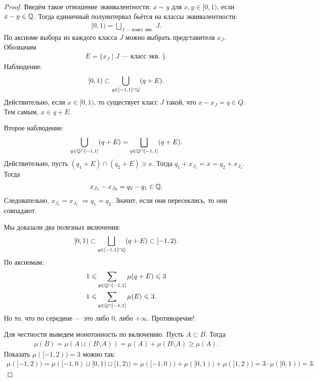 \begin{proof}
 Введём такое отношение эквивалентности: $ x \sim y $ для $ x,y \in [0, 1) $, если $ x-y \in \mathbb{Q} $. Тогда единичный полуинтервал бьётся на классы эквивалентности:
 \begin{align*}
  [0, 1) = \bigsqcup_{J \text{ --- класс экв. }} J
 .\end{align*} По аксиоме выбора из каждого класса $ J $ можно выбрать представителя $ x_J $. Обозначим
 \begin{align*}
  E = \{ x_J \mid J \text { --- класс экв. } \}
 .\end{align*} Наблюдение:
 \begin{align*}
  [0, 1) \subset \bigcup_{q \in [-1, 1] \cap \mathbb{Q}} (q + E)
 .\end{align*} Действительно, если $ x \in [0, 1) $, то существует класс $ J $ такой, что $ x - x_J = q \in Q $. Тем самым, $ x \in q + E $.

 Второе наблюдение:
 \begin{align*}
  \bigcup_{q \in \mathbb{Q} \cap [-1, 1]} (q + E) = \bigsqcup_{q \in \mathbb{Q} \cap [-1, 1]} (q + E)
 .\end{align*} Действительно, пусть $ (q_1 + E) \cap (q_2 + E) \ni x $. Тогда $ q_1 + x_{J_1} = x = q_2 + x_{J_2} $. Тогда
 \begin{align*}
  x_{J_1} - x_{J_2} = q_2 - q_1 \in \mathbb{Q}
 .\end{align*} Следовательно, $ x_{J_1} = x_{J_2} \;\Longrightarrow q_1 = q_2$. Значит, если они пересеклись, то они совпадают.
 
 Мы доказали два полезных включения:
 \begin{align*}
  [0, 1) \subset \bigsqcup_{q \in [-1, 1] \cap \mathbb{Q}} (q + E) \subset [-1, 2)
 .\end{align*} По аксиомам:
 \begin{align*}
  1 \leqslant &\sum_{q \in \mathbb{Q} \cap [-1, 1]} \mu(q + E) \leqslant 3 \\
  1 \leqslant &\sum_{q \in \mathbb{Q} \cap [-1, 1]} \mu(E) \leqslant 3 
 .\end{align*} Но то, что по середине --- это либо $ 0 $, либо $ +\infty $. Противоречие! 

 Для честности выведем монотонность по включению. Пусть $ A \subset B $. Тогда
 \begin{align*}
  \mu(B) = \mu(A \sqcup (B \setminus A)) = \mu(A) + \mu(B \setminus A) \geqslant \mu(A)
 .\end{align*} Показать $ \mu([-1, 2)) = 3 $ можно так:
 \begin{align*}
  \mu([-1, 2)) = \mu([-1, 0) \sqcup [0, 1) \sqcup [1, 2)) =\mu([-1, 0)) + \mu([0, 1)) + \mu([1, 2)) = 3 \cdot \mu([0, 1)) = 3
 .\end{align*}
\end{proof}

